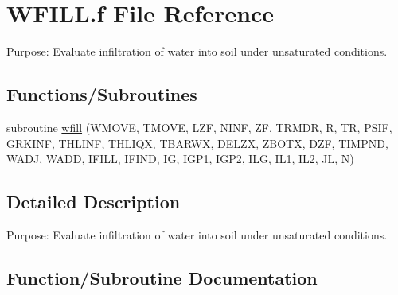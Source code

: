 \hypertarget{WFILL_8f}{}\section{W\+F\+I\+L\+L.\+f File Reference}
\label{WFILL_8f}


Purpose\+: Evaluate infiltration of water into soil under unsaturated conditions.  


\subsection*{Functions/\+Subroutines}
\begin{DoxyCompactItemize}
\item 
subroutine \hyperlink{WFILL_8f_a1162b1442a4411742ce29b99d59d72cc}{wfill} (W\+M\+O\+V\+E, T\+M\+O\+V\+E, L\+Z\+F, N\+I\+N\+F, Z\+F, T\+R\+M\+D\+R, R, T\+R, P\+S\+I\+F, G\+R\+K\+I\+N\+F, T\+H\+L\+I\+N\+F, T\+H\+L\+I\+Q\+X, T\+B\+A\+R\+W\+X, D\+E\+L\+Z\+X, Z\+B\+O\+T\+X, D\+Z\+F, T\+I\+M\+P\+N\+D, W\+A\+D\+J, W\+A\+D\+D, I\+F\+I\+L\+L, I\+F\+I\+N\+D, I\+G, I\+G\+P1, I\+G\+P2, I\+L\+G, I\+L1, I\+L2, J\+L, N)
\end{DoxyCompactItemize}


\subsection{Detailed Description}
Purpose\+: Evaluate infiltration of water into soil under unsaturated conditions. 



\subsection{Function/\+Subroutine Documentation}
\hypertarget{WFILL_8f_a1162b1442a4411742ce29b99d59d72cc}{}
